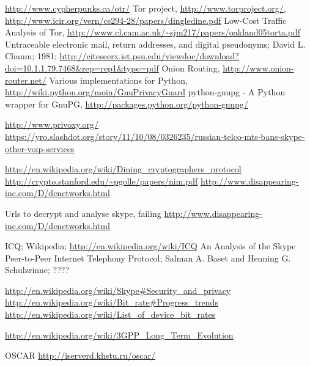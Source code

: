 \begin{thebibliography}{666}
 \url{http://www.cypherpunks.ca/otr/}
 Tor project, \url{http://www.torproject.org/},
    \url{http://www.icir.org/vern/cs294-28/papers/dingledine.pdf}
 Low-Cost Traffic Analysis of Tor,
    \url{http://www.cl.cam.ac.uk/~sjm217/papers/oakland05torta.pdf}
 Untraceable electronic mail, return addresses, and digital pseudonyms;
    David L. Chaum; 1981;
    \url{http://citeseerx.ist.psu.edu/viewdoc/download?doi=10.1.1.79.7468&rep=rep1&type=pdf}
 Onion Routing, \url{http://www.onion-router.net/}
 Various implementations for Python,
    \url{http://wiki.python.org/moin/GnuPrivacyGuard}
 python-gnupg - A Python wrapper for GnuPG,
    \url{http://packages.python.org/python-gnupg/}

 \url{http://www.privoxy.org/}
\url{https://yro.slashdot.org/story/11/10/08/0326235/russian-telco-mts-bans-skype-other-voip-services}

\url{http://en.wikipedia.org/wiki/Dining_cryptographers_protocol}
\url{http://crypto.stanford.edu/~pgolle/papers/nim.pdf}
\url{http://www.disappearing-inc.com/D/dcnetworks.html}

 Urls to decrypt and analyse skype, failing
\url{http://www.disappearing-inc.com/D/dcnetworks.html}

 ICQ; Wikipedia;
    \url{http://en.wikipedia.org/wiki/ICQ}
 An Analysis of the Skype Peer-to-Peer Internet
Telephony Protocol;
Salman A. Baset and Henning G. Schulzrinne;
????

 \url{http://en.wikipedia.org/wiki/Skype#Security_and_privacy}
 \url{http://en.wikipedia.org/wiki/Bit_rate#Progress_trends}
 \url{http://en.wikipedia.org/wiki/List_of_device_bit_rates}

 \url{http://en.wikipedia.org/wiki/3GPP_Long_Term_Evolution}

 OSCAR \url{http://iserverd.khstu.ru/oscar/}



\end{thebibliography}
